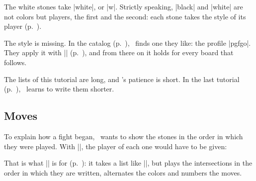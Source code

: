 \begin{goban}
The white stones take |white|, or |w|. Strictly speaking, |black| and |white| are not colors but players, the first and the second: each stone takes the style of its player (p.~\pageref{sec:jugadores}).

\begin{codeexample}[width=4.8cm]
\begin{goban}[label = {at = {north, west}}]
\end{goban}
\end{codeexample}

The style is missing. In the catalog (p.~\pageref{sec:catalogo}), \karu\ finds one they like: the profile |pgfgo|. They apply it with || (p.~\pageref{subsec:perfiles}), and from there on it holds for every board that follows.

\begin{codeexample}[width=4.8cm]

\begin{goban}[label = {at = {north, west}}]
\end{goban}
\end{codeexample}

The lists of this tutorial are long, and \karu's patience is short. In the last tutorial (p.~\pageref{tut:abreviar}), \karu\ learns to write them shorter.

\subsection{Moves}
\label{tut:movimientos}

To explain how a fight began, \karu\ wants to show the stones in the order in which they were played. With |\stone|, the player of each one would have to be given:

\begin{codeexample}
\begin{goban}
\end{goban}
\end{codeexample}

That is what |\moves| is for (p.~\pageref{subsec:movimientos}): it takes a list like |\stones|, but plays the intersections in the order in which they are written, alternates the colors and numbers the moves.


\end{goban}
